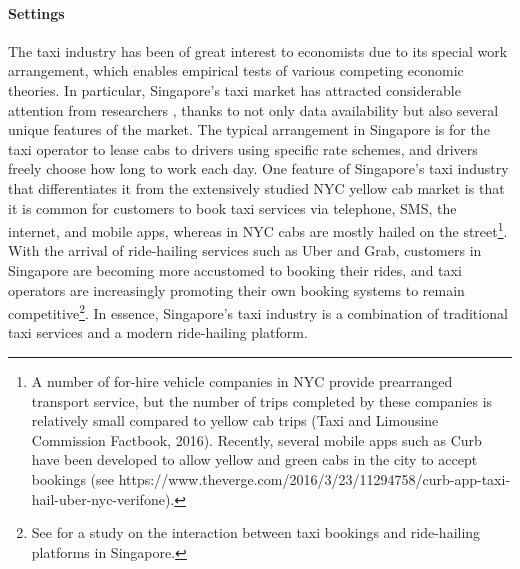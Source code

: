 \documentclass[reviewmode,AEJ]{AEA}
\begin{document}
\paragraph{Settings} The taxi industry has been of great interest to economists due to its special work 
arrangement, which enables empirical tests of various competing economic theories. In particular, 
Singapore's taxi market has attracted considerable attention from researchers \citep{Ho3074,chou2002testing,agarwal2015singaporean,agarwal2017anticipated,agarwal2018fickle}, 
thanks to not only data availability but also several unique features of the market. The typical 
arrangement in Singapore is for the taxi operator to lease cabs to drivers using specific rate schemes,
and drivers freely choose how long to work each day.
One feature of Singapore's taxi industry that differentiates it from the extensively studied NYC yellow 
cab market is that it is common for customers to book taxi services via telephone, SMS, the internet, 
and mobile apps, whereas in NYC cabs are mostly hailed on the street\footnote{A number of for-hire vehicle
companies in NYC provide prearranged transport service, but the number of trips completed by these companies 
is relatively small compared to yellow cab trips (Taxi and Limousine Commission Factbook, 2016). Recently,
several mobile apps such as Curb have been developed to allow yellow and green cabs in the city to accept
bookings (see https://www.theverge.com/2016/3/23/11294758/curb-app-taxi-hail-uber-nyc-verifone).}. 
With the arrival of ride-hailing services such as Uber and Grab, customers in Singapore are becoming more
accustomed to booking their rides, and taxi operators are increasingly promoting their own booking systems
to remain competitive\footnote{See \citet{agarwal2018fickle} for a study on the interaction between taxi 
bookings and ride-hailing platforms in Singapore.}. In essence, Singapore's taxi industry is a combination 
of traditional taxi services and a modern ride-hailing platform.

\end{document}
